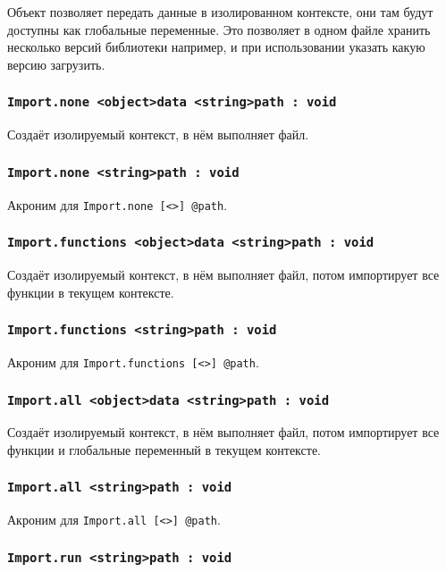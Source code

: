 Объект  позволяет передать данные в изолированном контексте, они там будут доступны как глобальные переменные. Это позволяет в одном файле хранить несколько версий библиотеки например, и при использовании указать какую версию загрузить.

\subsubsection{\lstinline|Import.none <object>data <string>path : void|}

Создаёт изолируемый контекст, в нём выполняет файл.

\subsubsection{\lstinline|Import.none <string>path : void|}

Акроним для \lstinline|Import.none [<>] @path|.

\subsubsection{\lstinline|Import.functions <object>data <string>path : void|}

Создаёт изолируемый контекст, в нём выполняет файл, потом импортирует все функции в текущем контексте.

\subsubsection{\lstinline|Import.functions <string>path : void|}

Акроним для \lstinline|Import.functions [<>] @path|.

\subsubsection{\lstinline|Import.all <object>data <string>path : void|}

Создаёт изолируемый контекст, в нём выполняет файл, потом импортирует все функции и глобальные переменный в текущем контексте.

\subsubsection{\lstinline|Import.all <string>path : void|}

Акроним для \lstinline|Import.all [<>] @path|.

\subsubsection{\lstinline|Import.run <string>path : void|}

